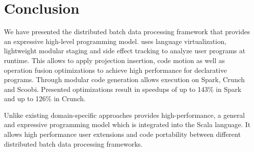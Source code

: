 \section{Conclusion}
\label{sec:conclusion}

We have presented the distributed batch data processing framework \tool that provides an
expressive high-level programming model. \tool uses language virtualization,
lightweight modular staging and side effect tracking to analyze user programs at
runtime. This allows \tool to apply projection insertion, code motion as well as
operation fusion optimizations to achieve high performance for declarative
programs. Through modular code generation \tool allows execution on Spark,
Crunch and Scoobi. Presented optimizations result in speedups of up to 143\% in
Spark and up to 126\% in Crunch.

Unlike existing domain-specific approaches \tool provides high-performance,
a general and expressive programming model which is integrated into the Scala
language. It allows high performance user extensions and code portability
between different distributed batch data processing frameworks.

